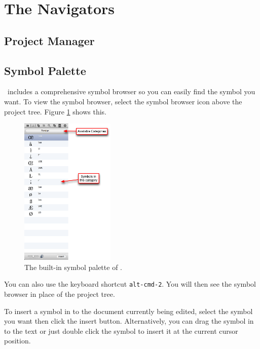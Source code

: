 \section{The Navigators}
\label{sec:navigators}

\subsection{Project Manager}
\label{sec:navigators:projectmanager}

\subsection{Symbol Palette}
\label{sec:navigators:symbolpalette}

\texnicle\ includes a comprehensive symbol browser so you can easily find the
symbol you want. To view the symbol browser, select the symbol browser icon
above the project tree.  Figure \ref{fig:symbolpalette} shows this.

\begin{figure}[htbp]
\centering
\includegraphics[width=0.4\textwidth]{userguide/images/symbolpalette.png}
\caption{The built-in symbol palette of \texnicle.}
\label{fig:symbolpalette}
\end{figure}

You can also use the keyboard shortcut \texttt{alt-cmd-2}. You will then see the symbol
browser in place of the project tree.

To insert a symbol in to the document currently being edited, select the symbol
you want then click the insert button. Alternatively, you can drag the symbol
in to the text or just double click the symbol to insert it at the current
cursor position.

